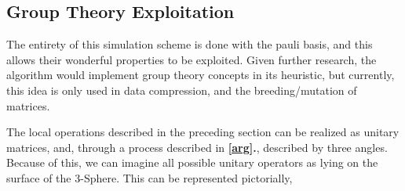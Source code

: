 \documentclass[11pt,twocolumn]{article}
\begin{document}


\subsection{Group Theory Exploitation}

	The entirety of this simulation scheme is done with the pauli basis, and this allows their wonderful properties to be exploited. Given further research, the algorithm would implement group theory concepts in its heuristic, but currently, this idea is only used in data compression, and the breeding/mutation of matrices. 

	The local operations described in the preceding section can be realized as unitary matrices, and, through a process described in \textbf{\ref{arg}.}, described by three angles. Because of this, we can imagine all possible unitary operators as lying on the surface of the 3-Sphere\cite{aerts}. This can be represented pictorially,
\end{document}
